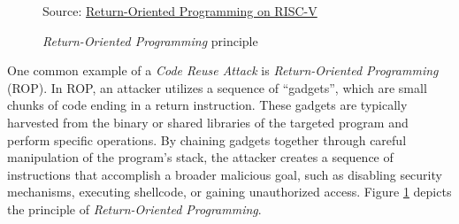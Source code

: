 \begin{figure}
  \centering
  \def\stackalignment{r} %
  {\scriptsize \parbox[t]{\linewidth}{Source: \href{http://dx.doi.org/10.1145/3320269.3384738}{Return-Oriented Programming on RISC-V}\cite{rop}}}
  \caption{\textit{Return-Oriented Programming} principle}
  \label{fig:rop}
\end{figure}

One common example of a \textit{Code Reuse Attack} is \textit{Return-Oriented
Programming} (ROP). In ROP, an attacker utilizes a sequence of ``gadgets'', which
are small chunks of code ending in a return instruction. These gadgets are
typically harvested from the binary or shared libraries of the targeted program
and perform specific operations. By chaining gadgets together through careful manipulation
of the program's stack, the attacker creates a sequence of instructions that
accomplish a broader malicious goal, such as disabling security mechanisms,
executing shellcode, or gaining unauthorized access. Figure \ref{fig:rop}
depicts the principle of \textit{Return-Oriented Programming}.

